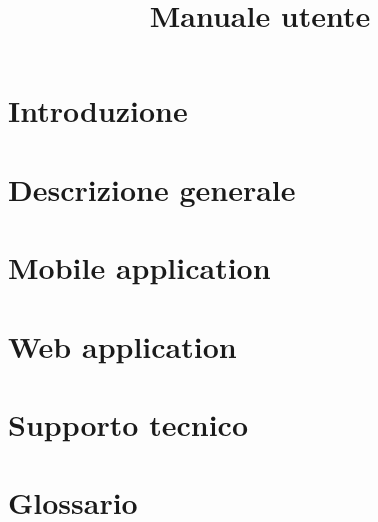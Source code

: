 \documentclass{article}
\title{Manuale utente}
\begin{document}


\section{Introduzione}%
\label{sec:introduzione}


\newpage
\section{Descrizione generale}%
\label{sec:descrizione_generale}


\newpage
\section{Mobile application}%
\label{sec:mobile_application}


\newpage
\section{Web application}%
\label{sec:web_application}


\newpage
\section{Supporto tecnico}%
\label{sec:supporto_tecnico}


\newpage
\appendix
\section{Glossario}%
\label{sec:glossario}

\end{document}
